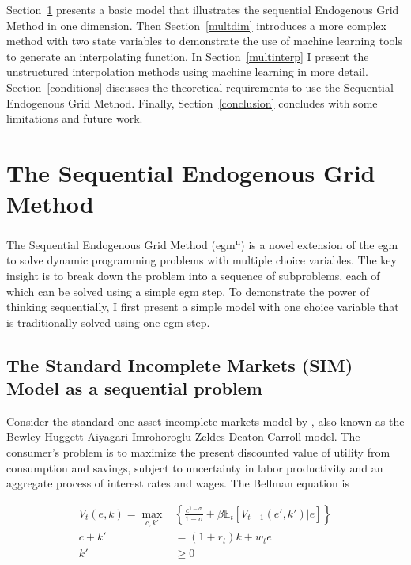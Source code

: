 \documentclass{article}
\begin{document}
Section~\ref{method} presents a basic model that illustrates the sequential Endogenous Grid Method in one dimension. Then Section~\ref{multdim} introduces a more complex method with two state variables to demonstrate the use of machine learning tools to generate an interpolating function. In Section~\ref{multinterp} I present the unstructured interpolation methods using machine learning in more detail. Section~\ref{conditions} discusses the theoretical requirements to use the Sequential Endogenous Grid Method. Finally, Section~\ref{conclusion} concludes with some limitations and future work.

\section{The Sequential Endogenous Grid Method}\label{method}

The Sequential Endogenous Grid Method (\acrshort{egm}\textsuperscript{n}) is a novel extension of the \acrshort{egm} to solve dynamic programming problems with multiple choice variables. The key insight is to break down the problem into a sequence of subproblems, each of which can be solved using a simple \acrshort{egm} step. To demonstrate the power of thinking sequentially, I first present a simple model with one choice variable that is traditionally solved using one \acrshort{egm} step.

\subsection{The Standard Incomplete Markets (SIM) Model as a sequential problem}

Consider the standard one-asset incomplete markets model by \cite{Krusell1998Income}, also known as the Bewley-Huggett-Aiyagari-Imrohoroglu-Zeldes-Deaton-Carroll model. The consumer's problem is to maximize the present discounted value of utility from consumption and savings, subject to uncertainty in labor productivity and an aggregate process of interest rates and wages. The Bellman equation is

\begin{align}
    V_t(e, k) = \max_{c, k'} & \left\{\frac{c^{1-\sigma}}{1-\sigma} + \beta \mathbb{E}_t\left[V_{t+1}(e', k')|e \right] \right\}
    \\
    c + k'                   & = (1 + r_t)k + w_t e
    \\
    k'                       & \geq 0
\end{align}
\end{document}
